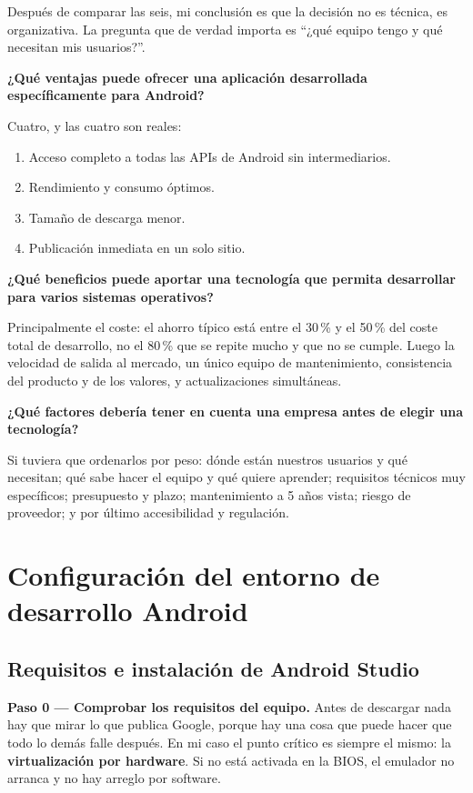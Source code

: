 \documentclass[11pt,a4paper]{article}
\newcommand{\campo}[1]{\textbf{\color{primary}#1}}
\begin{document}
	Después de comparar las seis, mi conclusión es que la decisión no es técnica, es organizativa. La pregunta que de verdad importa es \enquote{¿qué equipo tengo y qué necesitan mis usuarios?}.
	
	\campo{¿Qué ventajas puede ofrecer una aplicación desarrollada específicamente para Android?}
	
	Cuatro, y las cuatro son reales:
	\begin{enumerate}[leftmargin=*,itemsep=0.1em]
		\item Acceso completo a todas las APIs de Android sin intermediarios.
		\item Rendimiento y consumo óptimos.
		\item Tamaño de descarga menor.
		\item Publicación inmediata en un solo sitio.
	\end{enumerate}
	
	\campo{¿Qué beneficios puede aportar una tecnología que permita desarrollar para varios sistemas operativos?}
	
	Principalmente el coste: el ahorro típico está entre el 30\,\% y el 50\,\% del coste total de desarrollo, no el 80\,\% que se repite mucho y que no se cumple. Luego la velocidad de salida al mercado, un único equipo de mantenimiento, consistencia del producto y de los valores, y actualizaciones simultáneas.
	
	\campo{¿Qué factores debería tener en cuenta una empresa antes de elegir una tecnología?}
	
	Si tuviera que ordenarlos por peso: dónde están nuestros usuarios y qué necesitan; qué sabe hacer el equipo y qué quiere aprender; requisitos técnicos muy específicos; presupuesto y plazo; mantenimiento a 5 años vista; riesgo de proveedor; y por último accesibilidad y regulación.
	
	
	\newpage
	\section{Configuración del entorno de desarrollo Android}
	
	\subsection{Requisitos e instalación de Android Studio}
	
	\campo{Paso 0 --- Comprobar los requisitos del equipo.}
	Antes de descargar nada hay que mirar lo que publica Google, porque hay una cosa que puede hacer que todo lo demás falle después. En mi caso el punto crítico es siempre el mismo: la \textbf{virtualización por hardware}. Si no está activada en la BIOS, el emulador no arranca y no hay arreglo por software.
	
\end{document}

